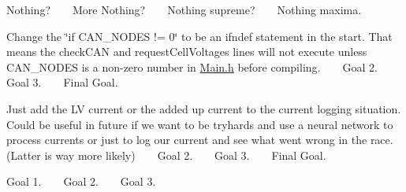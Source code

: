 
\begin{DoxyRefList}
\item[File \mbox{\hyperlink{_c_a_n_8h}{CAN.h}} ]\label{todo__todo000001}%
%
 Nothing? ~\newline
 ~\newline
 More Nothing? ~\newline
 ~\newline
 Nothing supreme? ~\newline
 ~\newline
 Nothing maxima.  
\item[File \mbox{\hyperlink{_c_a_n_8ino}{CAN.ino}} ]\label{todo__todo000002}%
%
 Change the \char`\"{}if CAN\+\_\+\+NODES != 0\char`\"{} to be an ifndef statement in the start. That means the check\+CAN and request\+Cell\+Voltages lines will not execute unless CAN\+\_\+\+NODES is a non-\/zero number in \mbox{\hyperlink{_main_8h}{Main.\+h}} before compiling. ~\newline
 ~\newline
 Goal 2. ~\newline
 ~\newline
 Goal 3. ~\newline
 ~\newline
 Final Goal.  
\item[File \mbox{\hyperlink{_data_logging_8h}{Data\+Logging.h}} ]\label{todo__todo000003}%
%
 Just add the LV current or the added up current to the current logging situation. Could be useful in future if we want to be tryhards and use a neural network to process currents or just to log our current and see what went wrong in the race. (Latter is way more likely) ~\newline
 ~\newline
 Goal 2. ~\newline
 ~\newline
 Goal 3. ~\newline
 ~\newline
 Final Goal.  
\item[File \mbox{\hyperlink{_data_logging_8ino}{Data\+Logging.ino}} ]\label{todo__todo000004}%
%
 Goal 1. ~\newline
 ~\newline
 Goal 2. ~\newline
 ~\newline
 Goal 3. ~\newline
 ~\newline

\end{DoxyRefList}
